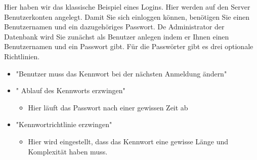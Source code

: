 Hier haben wir das klassische Beispiel eines Logins. Hier werden auf den Server Benutzerkonten angelegt. Damit Sie sich einloggen können, benötigen Sie einen Benutzernamen und ein dazugehöriges Passwort. De Administrator der Datenbank wird Sie zunächst als Benutzer anlegen indem er Ihnen einen Benutzernamen und ein Passwort gibt. Für die Passwörter gibt es drei optionale Richtlinien.
\begin{itemize}
\item "Benutzer muss das Kennwort bei der nächsten Anmeldung ändern"
\item " {Ablauf des Kennworts erzwingen}"
\begin{itemize}
\item Hier läuft das Passwort nach einer gewissen Zeit ab
\end{itemize}
\item "Kennwortrichtlinie erzwingen"
\begin{itemize}
\item Hier wird eingestellt, dass das Kennwort eine gewisse Länge und Komplexität haben muss.
\end{itemize}
\end{itemize}
